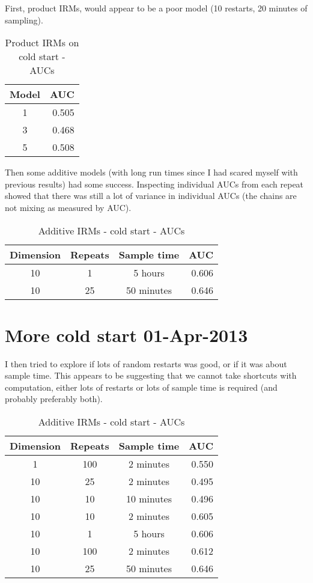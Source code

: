 \documentclass[twoside,11pt]{article}
\begin{document}
First, product IRMs, would appear to be a poor model (10 restarts, 20 minutes of sampling).

\begin{table*}[ht!]
\caption{{\small
Product IRMs on cold start - AUCs
}}
\label{tbl:Prod-IRM 29-Mar-2013}
\begin{center}
\begin{tabular}{c | r}
Model & AUC \\
\hline
1 & 0.505 \\
3 & 0.468 \\
5 & 0.508 
\end{tabular}
\end{center}
\end{table*}

Then some additive models (with long run times since I had scared myself with previous results) had some success.
Inspecting individual AUCs from each repeat showed that there was still a lot of variance in individual AUCs (\ie the chains are not mixing as measured by AUC).

\begin{table*}[ht!]
\caption{{\small
Additive IRMs - cold start - AUCs
}}
\label{tbl:Add-IRM 29-Mar-2013}
\begin{center}
\begin{tabular}{c c c | r}
Dimension & Repeats &  Sample time & AUC\\
\hline
10 & 1 & 5 hours & 0.606 \\
10 & 25 & 50 minutes & 0.646 
\end{tabular}
\end{center}
\end{table*}

\section{More cold start 01-Apr-2013}

I then tried to explore if lots of random restarts was good, or if it was about sample time.
This appears to be suggesting that we cannot take shortcuts with computation, either lots of restarts or lots of sample time is required (and probably preferably both).

\begin{table*}[ht!]
\caption{{\small
Additive IRMs - cold start - AUCs
}}
\label{tbl:Add-IRM 01-Apr-2013}
\begin{center}
\begin{tabular}{c c c | r}
Dimension & Repeats &  Sample time & AUC\\
\hline
1 & 100 & 2 minutes & 0.550 \\
10 & 25 & 2 minutes & 0.495 \\
10 & 10 & 10 minutes & 0.496 \\
10 & 10 & 2 minutes & 0.605 \\
10 & 1 & 5 hours & 0.606 \\
10 & 100 & 2 minutes & 0.612 \\
10 & 25 & 50 minutes & 0.646 
\end{tabular}
\end{center}
\end{table*}
\end{document}
